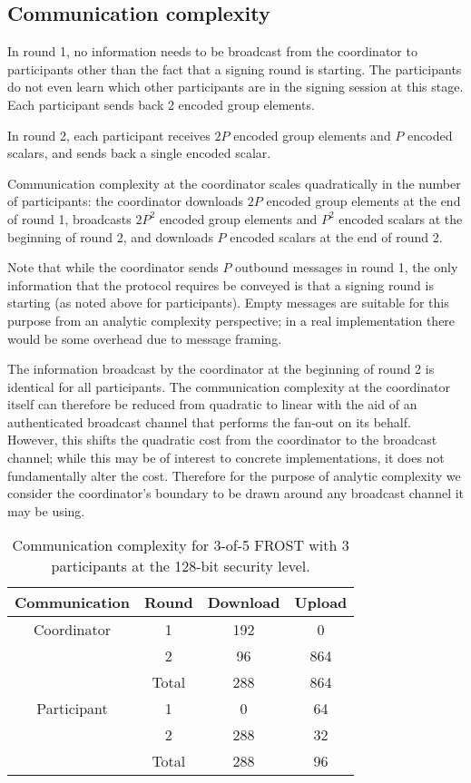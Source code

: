 \subsection{Communication complexity}

In round 1, no information needs to be broadcast from the coordinator to
participants other than the fact that a signing round is starting. The
participants do not even learn which other participants are in the signing
session at this stage. Each participant sends back 2 encoded group elements.

In round 2, each participant receives $2P$ encoded group elements and $P$
encoded scalars, and sends back a single encoded scalar.

Communication complexity at the coordinator scales quadratically in the number
of participants: the coordinator downloads $2P$ encoded group elements at
the end of round 1, broadcasts $2P^2$ encoded group elements and $P^2$ encoded
scalars at the beginning of round 2, and downloads $P$ encoded scalars at the
end of round 2.

Note that while the coordinator sends $P$ outbound messages in round 1, the only
information that the protocol requires be conveyed is that a signing round is
starting (as noted above for participants). Empty messages are suitable for this
purpose from an analytic complexity perspective; in a real implementation there
would be some overhead due to message framing.

The information broadcast by the coordinator at the beginning of round 2 is
identical for all participants. The communication complexity at the coordinator
itself can therefore be reduced from quadratic to linear with the aid of an
authenticated broadcast channel that performs the fan-out on its behalf.
However, this shifts the quadratic cost from the coordinator to the broadcast
channel; while this may be of interest to concrete implementations, it does not
fundamentally alter the cost. Therefore for the purpose of analytic complexity
we consider the coordinator's boundary to be drawn around any broadcast channel
it may be using.

\begin{table}
	\centering
	\begin{tabular}{c c c c}
		\toprule
		Communication & Round & Download & Upload \\ \midrule
		Coordinator & 1 & 192 & 0 \\
		            & 2 & 96 & 864 \\
		            & Total & 288 & 864 \\
		\midrule
		Participant & 1 & 0 & 64 \\
		            & 2 & 288 & 32 \\
		            & Total & 288 & 96 \\
		\bottomrule
	\end{tabular}
	\caption{Communication complexity for 3-of-5 FROST with 3 participants at the 128-bit security level.}
\end{table}


